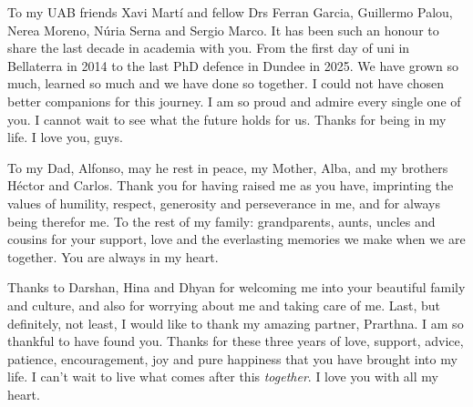 To my UAB friends Xavi Martí and fellow Drs Ferran Garcia, Guillermo Palou, Nerea Moreno, Núria Serna and Sergio Marco. It has been such an honour to share the last decade in academia with you. From the first day of uni in Bellaterra in 2014 to the last PhD defence in Dundee in 2025. We have grown so much, learned so much and we have done so together. I could not have chosen better companions for this journey. I am so proud and admire every single one of you. I cannot wait to see what the future holds for us. Thanks for being in my life. I love you, guys.

To my Dad, Alfonso, may he rest in peace, my Mother, Alba, and my brothers Héctor and Carlos. Thank you for having raised me as you have, imprinting the values of humility, respect, generosity and perseverance in me, and for always being therefor me. To the rest of my family: grandparents, aunts, uncles and cousins for your support, love and the everlasting memories we make when we are together. You are always in my heart.

Thanks to Darshan, Hina and Dhyan for welcoming me into your beautiful family and culture, and also for worrying about me and taking care of me. Last, but definitely, not least, I would like to thank my amazing partner, Prarthna. I am so thankful to have found you. Thanks for these three years of love, support, advice, patience, encouragement, joy and pure happiness that you have brought into my life. I can't wait to live what comes after this \textit{together}. I love you with all my heart.
















